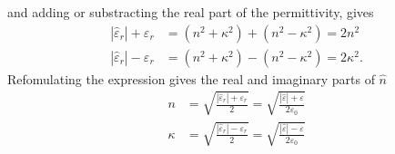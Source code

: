 and adding or substracting the real part of the permittivity, gives
\begin{align}
   |\hat{\varepsilon}_r| + \varepsilon_r &= (n^2 + \kappa^2) + (n^2 - \kappa^2) = 2n^2\\
   |\hat{\varepsilon}_r| - \varepsilon_r &= (n^2 + \kappa^2) - (n^2 - \kappa^2) = 2\kappa^2.
\end{align}
Refomulating the expression gives the real and imaginary parts of $\hat{n}$
\begin{align}
   n      &= \sqrt{ \frac{|\hat{\varepsilon}_r| + \varepsilon_r}{2}} 
           = \sqrt{ \frac{|\hat{\varepsilon}| + \varepsilon}{2\varepsilon_0}}\\
   \kappa &= \sqrt{ \frac{|\hat{\varepsilon}_r| - \varepsilon_r}{2}} 
           = \sqrt{ \frac{|\hat{\varepsilon}| - \varepsilon}{2\varepsilon_0}}
\end{align}


